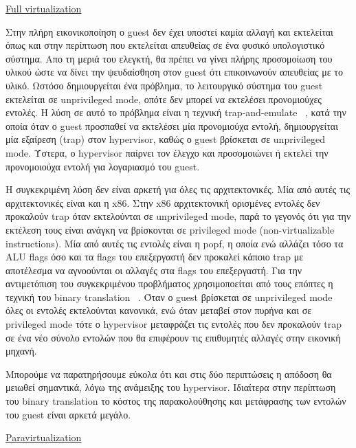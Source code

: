 \vspace{2ex}
\underline{Full virtualization}

\vspace{1ex}

Στην πλήρη εικονικοποίηση ο guest δεν έχει υποστεί καμία αλλαγή και εκτελείται
όπως και στην περίπτωση που εκτελείται απευθείας σε ένα φυσικό υπολογιστικό
σύστημα. Απο τη μεριά του ελεγκτή, θα πρέπει να γίνει πλήρης προσομοίωση του
υλικού ώστε να δίνει την ψευδαίσθηση στον guest ότι επικοινωνούν απευθείας με το
υλικό. Ωστόσο δημιουργείται ένα πρόβλημα, το λειτουργικό σύστημα του guest
εκτελείται σε unprivileged mode, οπότε δεν μπορεί να εκτελέσει προνομιούχες
εντολές. Η λύση σε αυτό το πρόβλημα είναι η τεχνική trap-and-emulate
~\cite{adams2006comparison}, κατά την οποία όταν ο guest προσπαθεί να εκτελέσει
μία προνομιούχα εντολή, δημιουργείται μία εξαίρεση (trap) στον hypervisor, καθώς
ο guest βρίσκεται σε unprivileged mode. Ύστερα, ο hypervisor παίρνει τον έλεγχο
και προσομοιώνει ή εκτελεί την προνομοιούχα εντολή για λογαριασμό του guest. 

H συγκεκριμένη λύση δεν είναι αρκετή για όλες τις αρχιτεκτονικές. Μία από αυτές
τις αρχιτεκτονικές είναι και η x86. Στην x86 αρχιτεκτονική ορισμένες εντολές
δεν προκαλούν trap όταν εκτελούνται σε unprivileged mode, παρά το γεγονός ότι
για την εκτέλεση τους είναι ανάγκη να βρίσκονται σε privileged mode
(non-virtualizable instructions). Μία από
αυτές τις εντολές είναι η popf, η οποία ενώ αλλάζει τόσο τα ALU flags όσο και τα
flags του επεξεργαστή δεν προκαλεί κάποιο trap με αποτέλεσμα να αγνοούνται οι
αλλαγές στα flags του επεξεργαστή. Για την αντιμετόπιση του συγκεκριμένου
προβλήματος χρησιμοποείται από τους επόπτες η τεχνική του binary translation
~\cite{adams2006comparison}. 
Όταν ο guest βρίσκεται σε unprivileged mode όλες οι εντολές εκτελούνται
κανονικά, ενώ όταν μεταβεί στον πυρήνα και σε privileged mode τότε ο hypervisor
μεταφράζει τις εντολές που δεν προκαλούν trap σε ένα νέο σύνολο εντολών που θα
επιφέρουν τις επιθυμητές αλλαγές στην εικονική μηχανή. 

Μπορούμε να παρατηρήσουμε εύκολα ότι και στις δύο περιπτώσεις η απόδοση θα
μειωθεί σημαντικά, λόγω της ανάμειξης του hypervisor. Ιδιαίτερα στην περίπτωση
του binary translation το κόστος της παρακολούθησης και μετάφρασης των εντολών
του guest είναι αρκετά μεγάλο. 

\vspace{2ex}
\underline{Paravirtualization}

\vspace{1ex}

